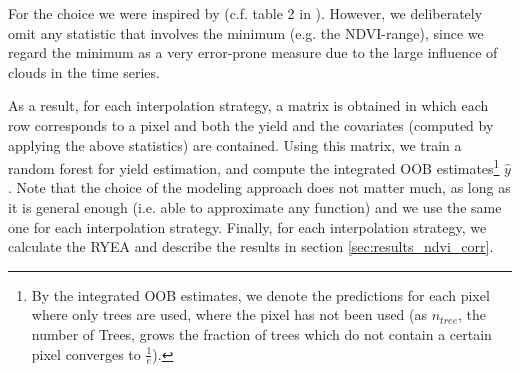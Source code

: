 {{{                %
        }
        For the choice we were inspired by (c.f. table 2 in \cite{kamirEstimatingWheatYields2020}). However, we deliberately omit any statistic that involves the minimum (e.g. the NDVI-range), since we regard the minimum as a very error-prone measure due to the large influence of clouds in the time series. 
        
        As a result, for each interpolation strategy, a matrix is obtained in which each row corresponds to a pixel and both the yield and the covariates (computed by applying the above statistics) are contained.
        Using this matrix, we train a random forest for yield estimation, and compute the integrated OOB estimates\footnote{By the integrated OOB estimates, we denote the predictions for each pixel where only trees are used, where the pixel has not been used (as $n_{tree}$, the number of Trees, grows the fraction of trees which do not contain a certain pixel converges to $\frac{1}{e}$).} $\hat y$. Note that the choice of the modeling approach does not matter much, as long as it is general enough (i.e. able to approximate any function) and we use the same one for each interpolation strategy. 
        Finally, for each interpolation strategy, we calculate the RYEA and describe the results in section \ref{sec:results_ndvi_corr}.
    }

    
    
    
}



